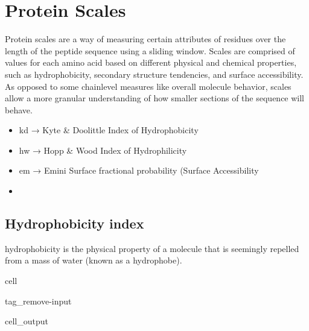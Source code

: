 \documentclass[letterpaper,10pt,english]{jupyterBook}
\begin{document}
\section{Protein Scales}
\label{\detokenize{ipynb/chapter1:protein-scales}}
\sphinxAtStartPar
Protein scales are a way of measuring certain attributes of residues over the length of the peptide sequence using a sliding window. Scales are comprised of values for each amino acid based on different physical and chemical properties, such as hydrophobicity, secondary structure tendencies, and surface accessibility. As opposed to some chain\sphinxhyphen{}level measures like overall molecule behavior, scales allow a more granular understanding of how smaller sections of the sequence will behave.
\begin{itemize}
\item {} 
\sphinxAtStartPar
kd → Kyte \& Doolittle Index of Hydrophobicity

\item {} 
\sphinxAtStartPar
hw → Hopp \& Wood Index of Hydrophilicity

\item {} 
\sphinxAtStartPar
em → Emini Surface fractional probability (Surface Accessibility

\item {} 
\end{itemize}


\subsection{Hydrophobicity index}
\label{\detokenize{ipynb/chapter1:hydrophobicity-index}}
\sphinxAtStartPar
hydrophobicity is the physical property of a molecule that is seemingly repelled from a mass of water (known as a hydrophobe).

\begin{sphinxuseclass}{cell}
\begin{sphinxuseclass}{tag_remove-input}\begin{sphinxVerbatimOutput}

\begin{sphinxuseclass}{cell_output}
\noindent{}

\end{sphinxuseclass}\end{sphinxVerbatimOutput}

\end{sphinxuseclass}
\end{sphinxuseclass}
\end{document}

